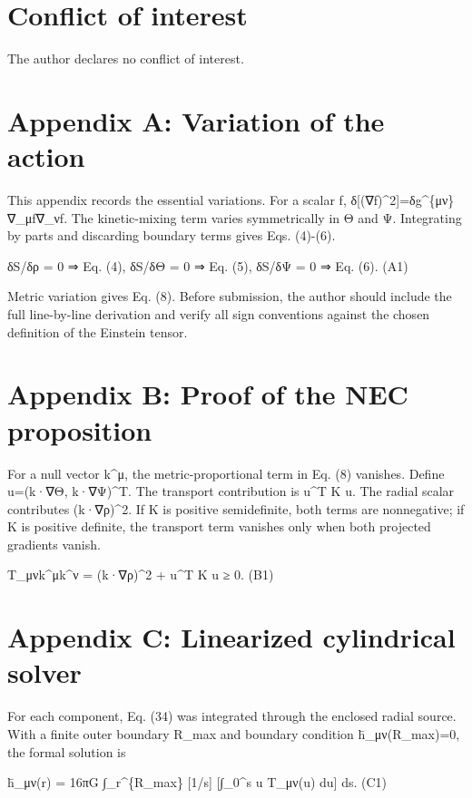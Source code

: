\section{Conflict of interest}\label{conflict-of-interest}

The author declares no conflict of interest.

\section{Appendix A: Variation of the
action}\label{appendix-a-variation-of-the-action}

This appendix records the essential variations. For a scalar f,
δ{[}(∇f)\^{}2{]}=δg\^{}\{μν\}∇\_μf∇\_νf. The kinetic-mixing term varies
symmetrically in Θ and Ψ. Integrating by parts and discarding boundary
terms gives Eqs. (4)-(6).

δS/δρ = 0 ⇒ Eq. (4), δS/δΘ = 0 ⇒ Eq. (5), δS/δΨ = 0 ⇒ Eq. (6). (A1)

Metric variation gives Eq. (8). Before submission, the author should
include the full line-by-line derivation and verify all sign conventions
against the chosen definition of the Einstein tensor.

\section{Appendix B: Proof of the NEC
proposition}\label{appendix-b-proof-of-the-nec-proposition}

For a null vector k\^{}μ, the metric-proportional term in Eq. (8)
vanishes. Define u=(k·∇Θ, k·∇Ψ)\^{}T. The transport contribution is
u\^{}T K u. The radial scalar contributes (k·∇ρ)\^{}2. If K is positive
semidefinite, both terms are nonnegative; if K is positive definite, the
transport term vanishes only when both projected gradients vanish.

T\_μνk\^{}μk\^{}ν = (k·∇ρ)\^{}2 + u\^{}T K u ≥ 0. (B1)

\section{Appendix C: Linearized cylindrical
solver}\label{appendix-c-linearized-cylindrical-solver}

For each component, Eq. (34) was integrated through the enclosed radial
source. With a finite outer boundary R\_max and boundary condition
h̄\_μν(R\_max)=0, the formal solution is

h̄\_μν(r) = 16πG ∫\_r\^{}\{R\_max\} {[}1/s{]} {[}∫\_0\^{}s u T\_μν(u)
du{]} ds. (C1)

